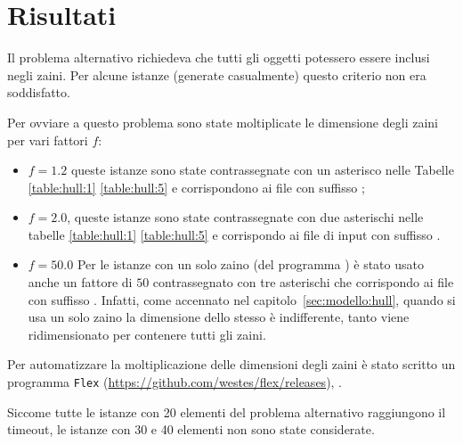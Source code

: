 \section{Risultati}
\label{sec:results}
Il problema alternativo richiedeva che tutti gli oggetti potessero
essere inclusi negli zaini. Per alcune istanze (generate casualmente) 
questo criterio non era soddisfatto.

Per ovviare a questo problema sono state moltiplicate le dimensione degli
zaini per vari fattori $f$:
\begin{itemize}
\item $f = 1.2$ queste istanze sono state contrassegnate con un asterisco nelle
Tabelle \ref{table:hull:1} \ref{table:hull:5} e corrispondono
ai file con suffisso ;
\item $f = 2.0$, queste istanze sono state contrassegnate con due asterischi
nelle tabelle \ref{table:hull:1} \ref{table:hull:5} 
e corrispondo ai file di input con suffisso .
\item $f = 50.0$ Per le istanze con un solo
zaino (del programma ) è stato usato anche un fattore di $50$ 
contrassegnato con tre asterischi che corrispondo ai file con suffisso
. 
Infatti,
come accennato nel capitolo~\ref{sec:modello:hull}, quando si usa un solo zaino
la dimensione dello stesso è indifferente, tanto viene ridimensionato
per contenere tutti gli zaini.

\end{itemize}


Per automatizzare la moltiplicazione delle dimensioni degli zaini è stato 
scritto un programma \verb|Flex| (\url{https://github.com/westes/flex/releases}),
.

Siccome tutte le istanze con 20 elementi del problema alternativo raggiungono
il timeout, le istanze con 30 e 40 elementi non sono state considerate.




